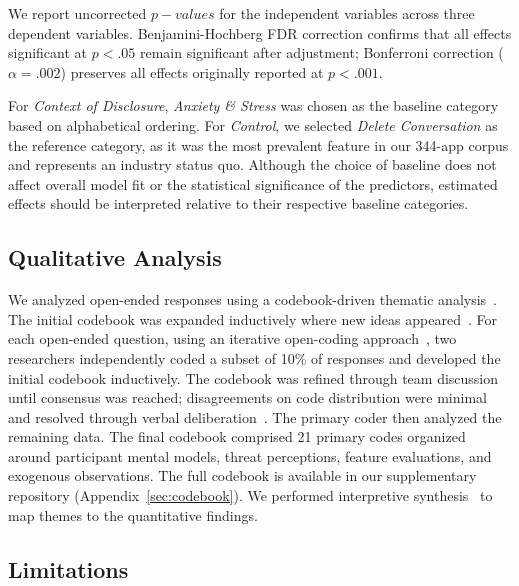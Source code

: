 \documentclass[letterpaper,twocolumn,10pt]{article}
\begin{document}
We report uncorrected $p-values$ for the independent variables across three dependent variables. Benjamini-Hochberg FDR correction confirms that all effects significant at $p < .05$ remain significant after adjustment; Bonferroni correction ($\alpha = .002$) preserves all effects originally reported at $p < .001$.

 For \textit{Context of Disclosure}, \emph{Anxiety \& Stress} was chosen as the baseline category based on alphabetical ordering. For \textit{Control}, we selected \emph{Delete Conversation} as the reference category, as it was the most prevalent feature in our 344-app corpus and represents an industry status quo. Although the choice of baseline does not affect overall model fit or the statistical significance of the predictors, estimated effects should be interpreted relative to their respective baseline categories.

\subsection{Qualitative Analysis}

We analyzed open-ended responses using a codebook-driven thematic analysis~\cite{saldana}. The initial codebook was expanded inductively where new ideas appeared~\cite{saldana}. For each open-ended question, using an iterative open-coding approach~\cite{strauss1990basics}, two researchers independently coded a subset of 10\% of responses and developed the initial codebook inductively. The codebook was refined through team discussion until consensus was reached; disagreements on code distribution were minimal and resolved through verbal deliberation~\cite{ortloff2023different}. The primary coder then analyzed the remaining data. The final codebook comprised 21 primary codes organized around participant mental models, threat perceptions, feature evaluations, and exogenous observations. The full codebook is available in our supplementary repository (Appendix~\ref{sec:codebook}). We performed interpretive synthesis~\cite{barnett2009methods} to map themes to the quantitative findings.

\subsection{Limitations}
\end{document}
